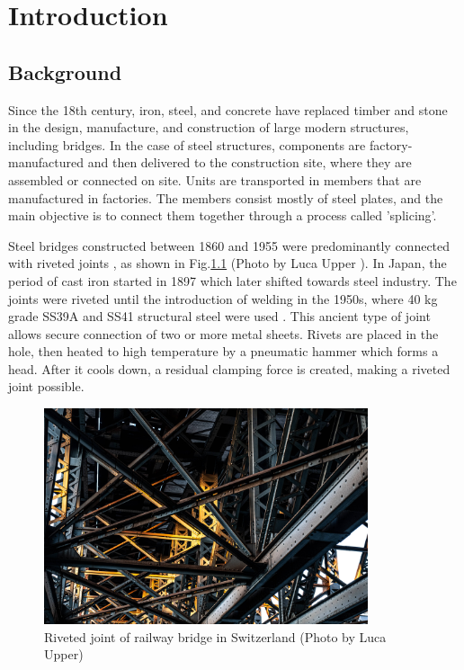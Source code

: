 \chapter{Introduction}
\label{ch1}

\begin{spacing}{1.25} %
\minitoc %
\end{spacing} %
\onehalfspacing %

\section{Background}

Since the 18th century, iron, steel, and concrete have replaced timber and stone in the design, manufacture, and construction of large modern structures, including bridges. In the case of steel structures, components are factory-manufactured and then delivered to the construction site, where they are assembled or connected on site. Units are transported in members that are manufactured in factories. The members consist mostly of steel plates, and the main objective is to connect them together through a process called 'splicing'.

Steel bridges constructed between 1860 and 1955 were predominantly connected with riveted joints \cite{Quentin2012MorphogenesisStructures, COLLETTE2014, Ambroziak2023CASEANALYSIS, Collette2012Les18401940, Costa2013RehabilitationBridge}, as shown in Fig.\ref{fig-intro1} (Photo by Luca Upper \cite{lucaphoto}). In Japan, the period of cast iron started in 1897 which later shifted towards steel industry. The joints were riveted until the introduction of welding in the 1950s, where 40 kg grade SS39A and SS41 structural steel were used \cite{rivet1934}. This ancient type of joint allows secure connection of two or more metal sheets. Rivets are placed in the hole, then heated to high temperature by a pneumatic hammer which forms a head. After it cools down, a residual clamping force is created, making a riveted joint possible.

\begin{figure}[htbp]
    \centering
    \includegraphics[width=0.85\textwidth]{imgs/intro/steel-structure.jpg}
    \caption{Riveted joint of railway bridge in Switzerland (Photo by Luca Upper)}
    \label{fig-intro1}
\end{figure}

